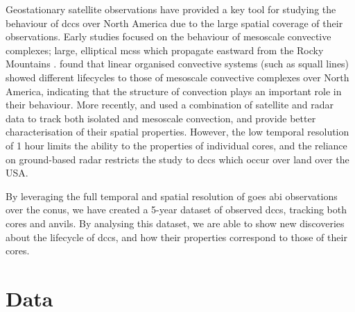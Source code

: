 Geostationary satellite observations have provided a key tool for studying the behaviour of \acrshort{dcc}s over North America due to the large spatial coverage of their observations.
Early studies focused on the behaviour of mesoscale convective complexes; large, elliptical \acrshort{mcs}s which propagate eastward from the Rocky Mountains \citep{maddox_mesoscale_1980, augustine_mesoscale_1988, augustine_mesoscale_1991}.
\citet{tsakraklides_global_2003a} found that linear organised convective systems (such as squall lines) showed different lifecycles to those of mesoscale convective complexes over North America, indicating that the structure of convection plays an important role in their behaviour.
More recently, \citet{feng_spatiotemporal_2019} and \citet{li_high-resolution_2021} used a combination of satellite and radar data to track both isolated and mesoscale convection, and provide better characterisation of their spatial properties.
However, the low temporal resolution of 1 hour limits the ability to the properties of individual cores, and the reliance on ground-based radar restricts the study to \acrshort{dcc}s which occur over land over the USA.

By leveraging the full temporal and spatial resolution of \acrshort{goes} \acrshort{abi} observations over the \acrshort{conus}, we have created a 5-year dataset of observed \acrshort{dcc}s, tracking both cores and anvils.
By analysing this dataset, we are able to show new discoveries about the lifecycle of \acrshort{dcc}s, and how their properties correspond to those of their cores.

\section{Data}

